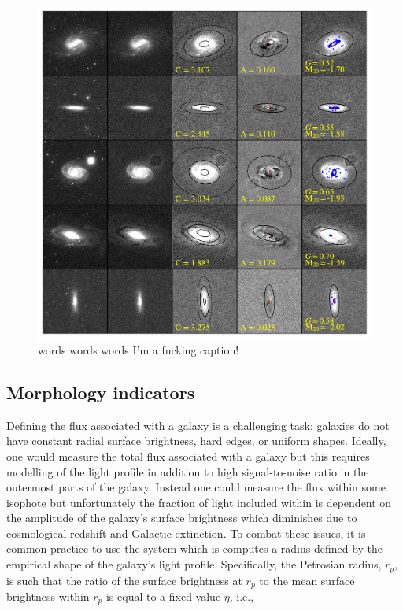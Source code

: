 \begin{figure}
\includegraphics[width=\textwidth]{Figures/measure_morph_hardest.pdf}
\caption[Examples of image cleaning and morphology diagnostic measurements]{words words words I'm a fucking caption!}
\label{fig: clean examples}
\end{figure}


\subsection{Morphology indicators}
Defining the flux associated with a galaxy is a challenging task: galaxies do not have constant radial surface brightness, hard edges, or uniform shapes. Ideally, one would measure the total flux associated with a galaxy but this requires modelling of the light profile in addition to high signal-to-noise ratio in the outermost parts of the galaxy. Instead one could measure the flux within some isophote but unfortunately the fraction of light included within is dependent on the amplitude of the galaxy's surface brightness which diminishes due to cosmological redshift and Galactic extinction. To combat these issues, it is common practice to use the \cite{Petrosian1976} system  which is computes a radius defined by the empirical shape of the galaxy's light profile. Specifically, the Petrosian radius, $r_p$, is such that the ratio of the surface brightness at $r_p$ to the mean surface brightness within $r_p$ is equal to a fixed value $\eta$, i.e., 

